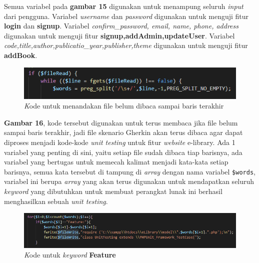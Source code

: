 \documentclass[a4paper,twoside]{article}
\begin{document}
\begin{enumerate}
Semua variabel pada \textbf{gambar 15} digunakan untuk menampung seluruh \textit{input} dari pengguna. Variabel \textit{username} dan \textit{password} digunakan untuk menguji fitur \textbf{login} dan \textbf{signup}. Variabel \textit{confirm\_password, email, name, phone, address} digunakan untuk menguji fitur \textbf{signup,addAdmin,updateUser}. Variabel \textit{code,title,author,publicatio\_year,publisher,theme} digunakan untuk menguji fitur \textbf{addBook}. 

\begin{figure}[h!]
			\includegraphics[scale=1.00]{../DokumenSkripsi/gambar/implementasi5}
			\centering
			\caption{\textit Kode untuk menandakan file belum dibaca sampai baris terakhir}
		\end{figure}

\textbf{Gambar 16}, kode tersebut digunakan untuk terus membaca jika file belum sampai baris terakhir, jadi file skenario Gherkin akan terus dibaca agar dapat diproses menjadi kode-kode \textit{unit testing} untuk fitur \textit{website} e-library. Ada 1 variabel yang penting di sini, yaitu setiap file sudah dibaca tiap barisnya, ada variabel yang bertugas untuk memecah kalimat menjadi kata-kata setiap barisnya, semua kata tersebut di tampung di \textit{array} dengan nama variabel \texttt{\$words}, variabel ini berupa \textit{array} yang akan terus digunakan untuk mendapatkan seluruh \textit{keyword} yang dibutuhkan untuk membuat perangkat lunak ini berhasil menghasilkan sebuah \textit{unit testing}. 

\begin{figure}[h!]
			\includegraphics[scale=1.00]{../DokumenSkripsi/gambar/implementasi6}
			\centering
			\caption{\textit Kode untuk \textit{keyword} \textbf{Feature}}
		\end{figure}


\end{enumerate}
\end{document}
